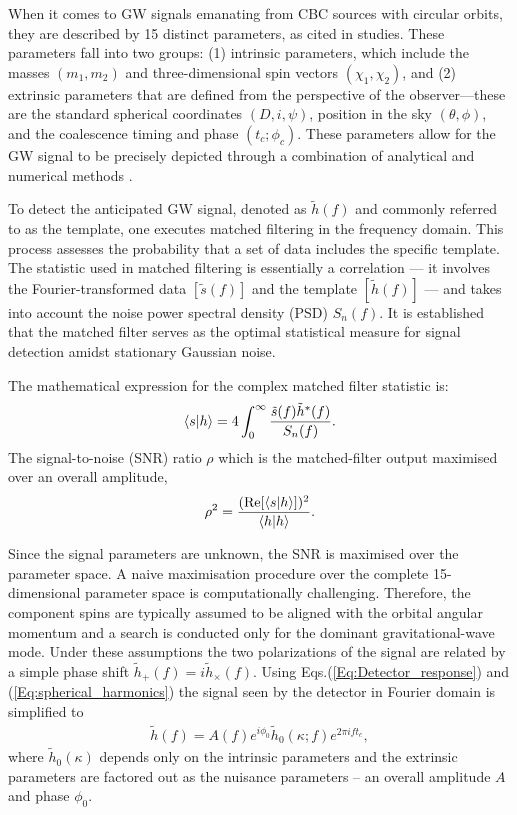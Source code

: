 When it comes to GW signals emanating from CBC sources with circular orbits, they are described by 15 distinct parameters, as cited in studies. These parameters fall into two groups: (1) intrinsic parameters, which include the masses $(m_1, m_2)$ and three-dimensional spin vectors $(\chi_1, \chi_2)$, and (2) extrinsic parameters that are defined from the perspective of the observer—these are the standard spherical coordinates $(D, i, \psi)$, position in the sky $(\theta, \phi)$, and the coalescence timing and phase $(t_c; \phi_c)$. These parameters allow for the GW signal to be precisely depicted through a combination of analytical and numerical methods .

To detect the anticipated GW signal, denoted as $\tilde{h}(f)$ and commonly referred to as the template, one executes matched filtering in the frequency domain. This process assesses the probability that a set of data includes the specific template. The statistic used in matched filtering is essentially a correlation — it involves the Fourier-transformed data $[\tilde{s}(f)]$ and the template $[\tilde{h}(f)]$ — and takes into account the noise power spectral density (PSD) $S_n(f)$. It is established that the matched filter serves as the optimal statistical measure for signal detection amidst stationary Gaussian noise.

The mathematical expression for the complex matched filter statistic is:
\begin{align}
    \label{Eq:matched_filter}
    \braket{s|h} = 4\int_{0}^{\infty} \dfrac{\tilde{s}(f)\tilde{h}^*(f)}{S_n(f)}.
\end{align}
The signal-to-noise (SNR) ratio $\rho$ which is the matched-filter output maximised over an overall amplitude,   
\begin{align}
    \label{Eq:SNR_def}
    \rho^2 = \dfrac{(\operatorname{Re}[\braket{s|h}])^2}{\braket{h|h}}.
\end{align}

Since the signal parameters are unknown, the SNR is maximised over the parameter space. A naive maximisation procedure over the complete 15-dimensional parameter space is computationally challenging. Therefore, the component spins are typically assumed to be aligned with the orbital angular momentum and a search is conducted only for the dominant gravitational-wave mode. Under these assumptions the two polarizations of the signal are related by a simple phase shift $\tilde{h}_+(f) = i \tilde{h}_{\times}(f)$. Using Eqs.(\ref{Eq:Detector_response}) and (\ref{Eq:spherical_harmonics}) the signal seen by the detector in Fourier domain is simplified to 
\begin{align}
    \label{Eq:maxmising_templates}
    \tilde{h}(f) = A(f)e^{i \phi_0}\tilde{h}_0(\kappa; f)e^{2\pi i f t_c},
\end{align}
where $\tilde{h}_0(\kappa)$ depends only on the intrinsic parameters and the extrinsic parameters are factored out as the nuisance parameters -- an overall amplitude $A$ and phase $\phi_0$. 

